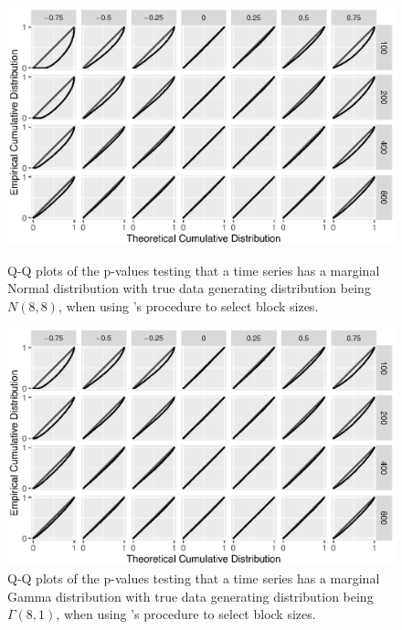 \documentclass[12pt]{article}
\begin{document}
\begin{figure}[tbp]
  \includegraphics[width = .9\textwidth]{figures/alt_normal}
  \centering
  \vspace{-10pt}
  \caption{Q-Q plots of the p-values testing that a time series
    has a marginal Normal distribution with true data generating distribution
    being $N(8,8)$, when using \citet{politis2004automatic}'s procedure
    to select block sizes.}
  \label{fig:alt_qq_n}
    \hspace{3cm}
  \includegraphics[width = .9\textwidth]{figures/alt_gamma}
  \vspace{-5pt}
  \caption{Q-Q plots of the p-values testing that a time series
    has a marginal Gamma distribution with true data generating distribution
    being $\Gamma(8,1)$, when using \citet{politis2004automatic}'s procedure
    to select block sizes.}
  \label{fig:alt_qq_g}
\end{figure}
\end{document}
